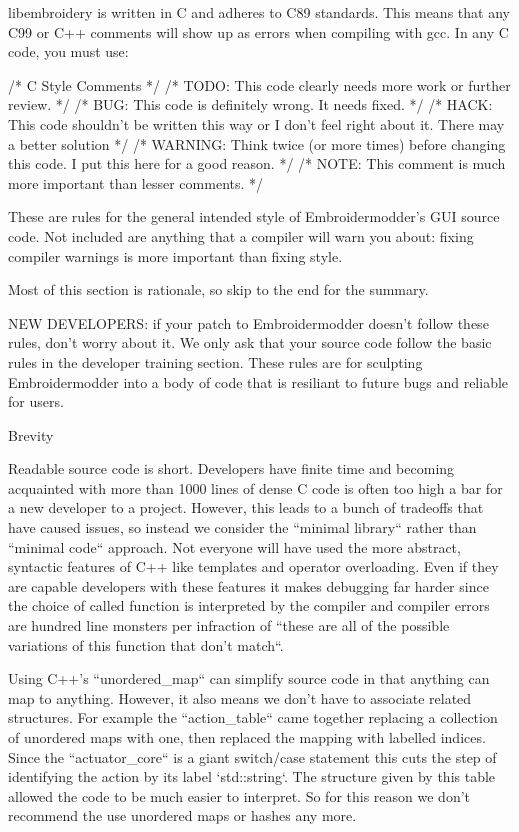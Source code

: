 \documentclass[a4paper]{report}
\begin{document}
{libembroidery is written in C and adheres to C89 standards. This means
that any C99 or C++ comments will show up as errors when compiling with
gcc. In any C code, you must use:

    /* C Style Comments */
    /* TODO: This code clearly needs more work or further review. */
    /* BUG: This code is definitely wrong. It needs fixed. */
    /* HACK: This code shouldn't be written this way or I don't feel right about it. There may a better solution */
    /* WARNING: Think twice (or more times) before changing this code. I put this here for a good reason. */
    /* NOTE: This comment is much more important than lesser comments. */

These are rules for the general intended style of Embroidermodder's GUI source
code. Not included are anything that a compiler will warn you about: fixing
compiler warnings is more important than fixing style.

Most of this section is rationale, so skip to the end for the summary.

NEW DEVELOPERS: if your patch to Embroidermodder doesn't follow these rules,
don't worry about it. We only ask that your source code follow the basic rules
in the developer training section. These rules are for sculpting Embroidermodder
into a body of code that is resiliant to future bugs and reliable for users.

Brevity
~~~~~~~

Readable source code is short. Developers have finite time and becoming
acquainted with more than 1000 lines of dense C code is often too high a bar
for a new developer to a project. However, this leads to a bunch of tradeoffs
that have caused issues, so instead we consider the ``minimal library``
rather than ``minimal code`` approach. Not everyone will have used the more
abstract, syntactic features of C++ like templates and operator overloading.
Even if they are capable developers with these features it makes debugging far
harder since the choice of called function is interpreted by the compiler and compiler
errors are hundred line monsters per infraction of ``these are all of the possible
variations of this function that don't match``.

Using C++'s ``unordered_map`` can simplify source code in that anything can
map to anything. However, it also means we don't have to associate related structures.
For example the ``action_table`` came together replacing a collection of unordered maps
with one, then replaced the mapping with labelled indices. Since the ``actuator_core``
is a giant switch/case statement this cuts the step of identifying the action by its
label `std::string`.
The structure given by this table allowed the code to be much
easier to interpret. So for this reason we don't recommend the use unordered maps or hashes any more.

}
\end{document}

